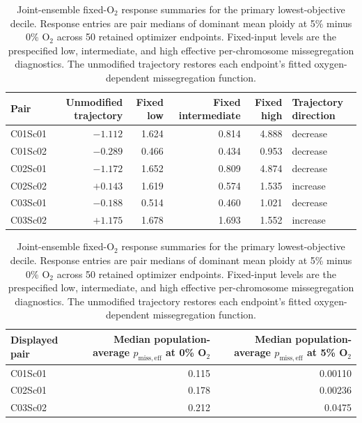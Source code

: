\begin{table}[!htbp]
\centering
\scriptsize
\setlength{\tabcolsep}{3.2pt}
\caption{Joint-ensemble fixed-O$_2$ response summaries for the primary lowest-objective decile. Response entries are pair medians of dominant mean ploidy at 5\% minus 0\% O$_2$ across 50 retained optimizer endpoints. Fixed-input levels are the prespecified low, intermediate, and high effective per-chromosome missegregation diagnostics. The unmodified trajectory restores each endpoint's fitted oxygen-dependent missegregation function.}
\label{tab:joint_fixed_o2_summary}
\begin{tabular}{@{}lrrrrl@{}}
\toprule
Pair & Unmodified trajectory & Fixed low & Fixed intermediate & Fixed high & Trajectory direction \\
\midrule
C01Sc01 & $-1.112$ & 1.624 & 0.814 & 4.888 & decrease \\
C01Sc02 & $-0.289$ & 0.466 & 0.434 & 0.953 & decrease \\
C02Sc01 & $-1.172$ & 1.652 & 0.809 & 4.874 & decrease \\
C02Sc02 & $+0.143$ & 1.619 & 0.574 & 1.535 & increase \\
C03Sc01 & $-0.188$ & 0.514 & 0.460 & 1.021 & decrease \\
C03Sc02 & $+1.175$ & 1.678 & 1.693 & 1.552 & increase \\
\bottomrule
\end{tabular}

\vspace{0.8em}
\begin{tabular}{@{}lrr@{}}
\toprule
Displayed pair & \shortstack{Median population-average $p_{\mathrm{miss,eff}}$\\at 0\% O$_2$} & \shortstack{Median population-average $p_{\mathrm{miss,eff}}$\\at 5\% O$_2$} \\
\midrule
C01Sc01 & 0.115 & 0.00110 \\
C02Sc01 & 0.178 & 0.00236 \\
C03Sc02 & 0.212 & 0.0475 \\
\bottomrule
\end{tabular}


\end{table}
